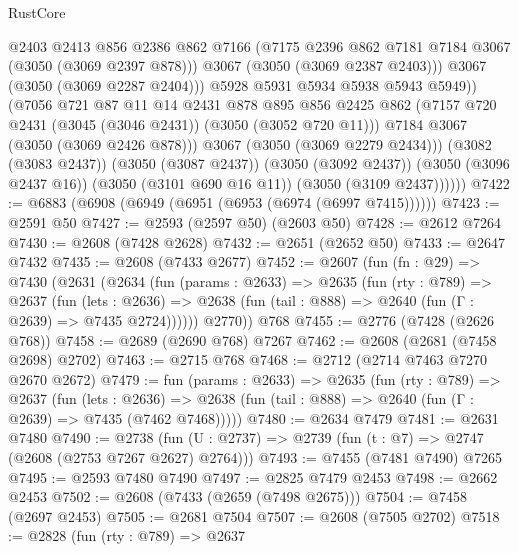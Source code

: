 \begin{lexlean}{RustCore}
\begin{coremodule}
                      @2403
                      @2413
                      @856
                      @2386
                      @862
                      @7166
                      (@7175 @2396 @862 @7181 @7184 @3067 (@3050 (@3069 @2397 @878)))
                      @3067
                      (@3050 (@3069 @2387 @2403)))
                    @3067
                    (@3050 (@3069 @2287 @2404)))
                  @5928
                  @5931
                  @5934
                  @5938
                  @5943
                  @5949))
              (@7056
                @721
                @87
                @11
                @14
                @2431
                @878
                @895
                @856
                @2425
                @862
                (@7157 @720 @2431 (@3045 (@3046 @2431)) (@3050 (@3052 @720 @11)))
                @7184
                @3067
                (@3050 (@3069 @2426 @878)))
              @3067
              (@3050 (@3069 @2279 @2434)))
            (@3082 (@3083 @2437))
            (@3050 (@3087 @2437))
            (@3050 (@3092 @2437))
            (@3050 (@3096 @2437 @16))
            (@3050 (@3101 @690 @16 @11))
            (@3050 (@3109 @2437))))))
@7422 := @6883 (@6908 (@6949 (@6951 (@6953 (@6974 (@6997 @7415))))))
@7423 := @2591 @50
@7427 := @2593 (@2597 @50) (@2603 @50)
@7428 := @2612 @7264
@7430 := @2608 (@7428 @2628)
@7432 := @2651 (@2652 @50)
@7433 := @2647 @7432
@7435 := @2608 (@7433 @2677)
@7452 := @2607
    (fun (fn : @29) =>
    @7430
      (@2631
        (@2634
          (fun (params : @2633) =>
          @2635
            (fun (rty : @789) =>
            @2637
              (fun (lets : @2636) =>
              @2638 (fun (tail : @888) => @2640 (fun (Γ : @2639) => @7435 @2724))))))
        @2770))
    @768
@7455 := @2776 (@7428 (@2626 @768))
@7458 := @2689 (@2690 @768) @7267
@7462 := @2608 (@2681 (@7458 @2698) @2702)
@7463 := @2715 @768
@7468 := @2712 (@2714 @7463 @7270 @2670 @2672)
@7479 := fun (params : @2633) =>
  @2635
    (fun (rty : @789) =>
    @2637
      (fun (lets : @2636) =>
      @2638 (fun (tail : @888) => @2640 (fun (Γ : @2639) => @7435 (@7462 @7468)))))
@7480 := @2634 @7479
@7481 := @2631 @7480
@7490 := @2738 (fun (U : @2737) => @2739 (fun (t : @7) => @2747 (@2608 (@2753 @7267 @2627) @2764)))
@7493 := @7455 (@7481 @7490) @7265
@7495 := @2593 @7480 @7490
@7497 := @2825 @7479 @2453
@7498 := @2662 @2453
@7502 := @2608 (@7433 (@2659 (@7498 @2675)))
@7504 := @7458 (@2697 @2453)
@7505 := @2681 @7504
@7507 := @2608 (@7505 @2702)
@7518 := @2828
    (fun (rty : @789) =>
    @2637

\end{coremodule}
\end{lexlean}
